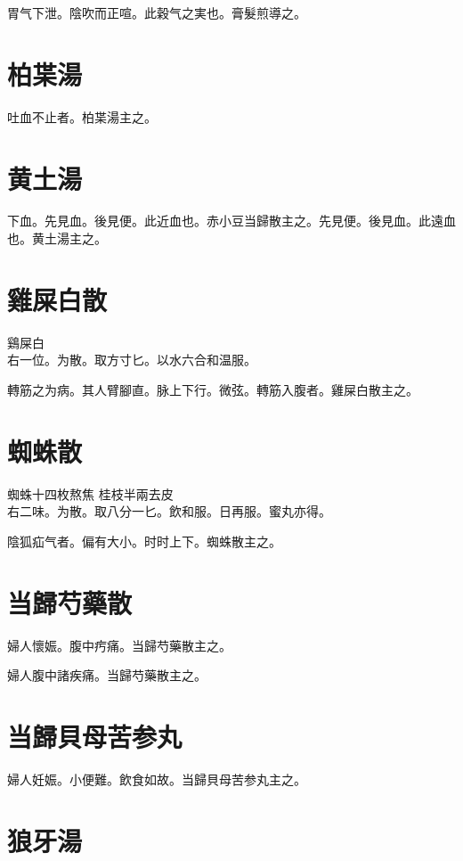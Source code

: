 胃气下泄。陰吹而正喧。此穀气之実也。膏髮煎導之。

\section{柏枼湯}

吐血不止者。柏枼湯主之。

\section{黄土湯}

下血。先見血。後見便。此近血也。赤小豆当歸散主之。先見便。後見血。此遠血也。黄土湯主之。

\section{雞屎白散}

鷄屎白\\
右一位。为散。取方寸匕。以水六合和温服。

轉筋之为病。其人臂腳直。脉上下行。微弦。轉筋入腹者。雞屎白散主之。

\section{蜘蛛散}

蜘蛛{\scriptsize 十四枚熬焦} 桂枝{\scriptsize 半兩去皮}\\
右二味。为散。取八分一匕。飲和服。日再服。蜜丸亦得。

陰狐疝气者。偏有大小。时时上下。蜘蛛散主之。

\section{当歸芍藥散}

婦人懷娠。腹中㽲痛。当歸芍藥散主之。

婦人腹中諸疾痛。当歸芍藥散主之。

\section{当歸貝母苦参丸}

{\khaaitp 婦人}妊娠。小便難。飲食如故。{\khaaitp 当}歸{\khaaitp 貝}母苦参丸主之。

\section{狼牙湯}

